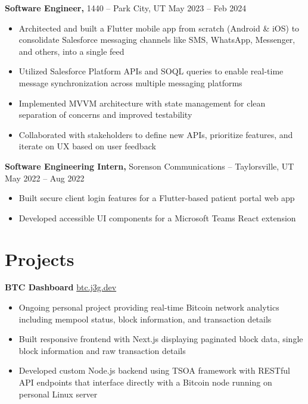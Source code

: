 \documentclass[11pt]{article}       %
\begin{document}
\textbf{Software Engineer,} 1440 -- Park City, UT \hfill May 2023 -- Feb 2024 \\
\vspace{-9pt}
\begin{itemize}
  \item Architected and built a Flutter mobile app from scratch (Android \& iOS) to consolidate Salesforce messaging channels like SMS, WhatsApp, Messenger, and others, into a single feed
  \item Utilized Salesforce Platform APIs and SOQL queries to enable real-time message synchronization across multiple messaging platforms
  \item Implemented MVVM architecture with state management for clean separation of concerns and improved testability
  \item Collaborated with stakeholders to define new APIs, prioritize features, and iterate on UX based on user feedback
\end{itemize}

\textbf{Software Engineering Intern,} Sorenson Communications -- Taylorsville, UT \hfill May 2022 -- Aug 2022 \\
\vspace{-9pt}
\begin{itemize}
  \item Built secure client login features for a Flutter-based patient portal web app
  \item Developed accessible UI components for a Microsoft Teams React extension
\end{itemize}


\vspace{-18.5pt}

\section*{Projects}
\textbf{BTC Dashboard} \hfill \href{https://btc.j3g.dev/}{btc.j3g.dev} \\
\vspace{-9pt}
\begin{itemize}
  \item Ongoing personal project providing real-time Bitcoin network analytics including mempool status, block information, and transaction details
  \item Built responsive frontend with Next.js displaying paginated block data, single block information and raw transaction details
  \item Developed custom Node.js backend using TSOA framework with RESTful API endpoints that interface directly with a Bitcoin node running on personal Linux server
\end{itemize}
\end{document}
